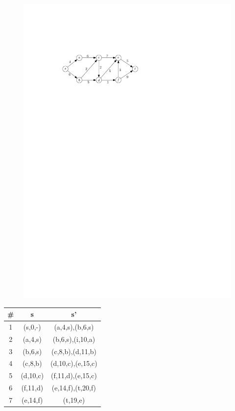 \documentclass[paper=a4, fontsize=11pt]{scrartcl}
\numberwithin{equation}{section}
\numberwithin{figure}{section}
\numberwithin{table}{section}
\begin{document}
\begin{figure}[h!]
	\centering
	\includegraphics[scale=0.9]{dijkstra}
\end{figure}

\begin{tabular}{|c||c|c|}
\hline
# & s & s' \\\hline
1 & (s,0,-) & (a,4,s),(b,6,s) \\\hline
2 & (a,4,s) & (b,6,s),(i,10,a) \\\hline
3 & (b,6,s) & (c,8,b),(d,11,b) \\\hline
4 & (c,8,b) & (d,10,c),(e,15,c) \\\hline
5 & (d,10,c) & (f,11,d),(e,15,c) \\\hline
6 & (f,11,d) & (e,14,f),(t,20,f) \\\hline
7 & (e,14,f) & (t,19,e) \\\hline
\end{tabular}
\end{document}
